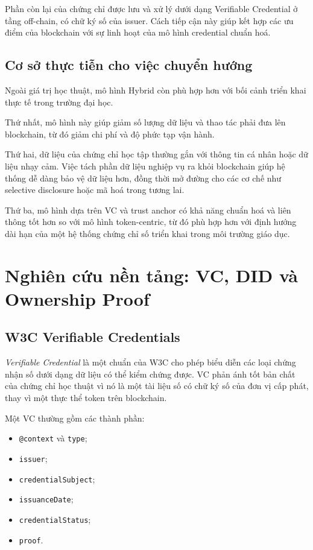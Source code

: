 Phần còn lại của chứng chỉ được lưu và xử lý dưới dạng Verifiable Credential ở tầng off-chain, có chữ ký số của issuer. Cách tiếp cận này giúp kết hợp các ưu điểm của blockchain với sự linh hoạt của mô hình credential chuẩn hoá.

\subsection{Cơ sở thực tiễn cho việc chuyển hướng}

Ngoài giá trị học thuật, mô hình Hybrid còn phù hợp hơn với bối cảnh triển khai thực tế trong trường đại học.

Thứ nhất, mô hình này giúp giảm số lượng dữ liệu và thao tác phải đưa lên blockchain, từ đó giảm chi phí và độ phức tạp vận hành.

Thứ hai, dữ liệu của chứng chỉ học tập thường gắn với thông tin cá nhân hoặc dữ liệu nhạy cảm. Việc tách phần dữ liệu nghiệp vụ ra khỏi blockchain giúp hệ thống dễ dàng bảo vệ dữ liệu hơn, đồng thời mở đường cho các cơ chế như selective disclosure hoặc mã hoá trong tương lai.

Thứ ba, mô hình dựa trên VC và trust anchor có khả năng chuẩn hoá và liên thông tốt hơn so với mô hình token-centric, từ đó phù hợp hơn với định hướng dài hạn của một hệ thống chứng chỉ số triển khai trong môi trường giáo dục.

\section{Nghiên cứu nền tảng: VC, DID và Ownership Proof}

\subsection{W3C Verifiable Credentials}

\textit{Verifiable Credential} là một chuẩn của W3C cho phép biểu diễn các loại chứng nhận số dưới dạng dữ liệu có thể kiểm chứng được. VC phản ánh tốt bản chất của chứng chỉ học thuật vì nó là một tài liệu số có chữ ký số của đơn vị cấp phát, thay vì một thực thể token trên blockchain.

Một VC thường gồm các thành phần:
\begin{itemize}
    \item \texttt{@context} và \texttt{type};
    \item \texttt{issuer};
    \item \texttt{credentialSubject};
    \item \texttt{issuanceDate};
    \item \texttt{credentialStatus};
    \item \texttt{proof}.
\end{itemize}

